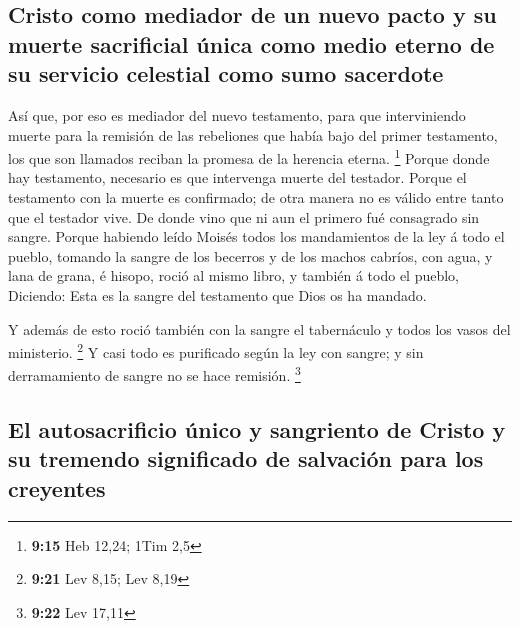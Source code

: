 \hypertarget{cristo-como-mediador-de-un-nuevo-pacto-y-su-muerte-sacrificial-uxfanica-como-medio-eterno-de-su-servicio-celestial-como-sumo-sacerdote}{%
\subsection{Cristo como mediador de un nuevo pacto y su muerte
sacrificial única como medio eterno de su servicio celestial como sumo
sacerdote}\label{cristo-como-mediador-de-un-nuevo-pacto-y-su-muerte-sacrificial-uxfanica-como-medio-eterno-de-su-servicio-celestial-como-sumo-sacerdote}}

 Así que, por eso es mediador del nuevo testamento, para
que interviniendo muerte para la remisión de las rebeliones que había
bajo del primer testamento, los que son llamados reciban la promesa de
la herencia eterna. \footnote{\textbf{9:15} Heb 12,24; 1Tim 2,5}
 Porque donde hay testamento, necesario es que intervenga
muerte del testador.  Porque el testamento con la muerte es
confirmado; de otra manera no es válido entre tanto que el testador
vive.  De donde vino que ni aun el primero fué consagrado
sin sangre.  Porque habiendo leído Moisés todos los
mandamientos de la ley á todo el pueblo, tomando la sangre de los
becerros y de los machos cabríos, con agua, y lana de grana, é hisopo,
roció al mismo libro, y también á todo el pueblo, 
Diciendo: Esta es la sangre del testamento que Dios os ha mandado.

 Y además de esto roció también con la sangre el
tabernáculo y todos los vasos del ministerio. \footnote{\textbf{9:21}
  Lev 8,15; Lev 8,19}  Y casi todo es purificado según la
ley con sangre; y sin derramamiento de sangre no se hace remisión.
\footnote{\textbf{9:22} Lev 17,11}

\hypertarget{el-autosacrificio-uxfanico-y-sangriento-de-cristo-y-su-tremendo-significado-de-salvaciuxf3n-para-los-creyentes}{%
\subsection{El autosacrificio único y sangriento de Cristo y su tremendo
significado de salvación para los
creyentes}\label{el-autosacrificio-uxfanico-y-sangriento-de-cristo-y-su-tremendo-significado-de-salvaciuxf3n-para-los-creyentes}}

